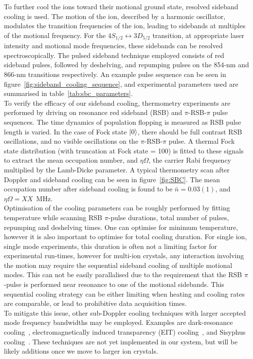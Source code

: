     To further cool the ions toward their motional ground state, resolved
    sideband cooling is used. The motion of the ion, described by a harmonic oscillator,
    modulates the transition frequencies of the ion, leading to sidebands at
    multiples of the motional frequency. For the $4S_{1/2} \leftrightarrow
    3D_{5/2}$ transition, at appropriate laser intensity and motional mode
    frequencies, these sidebands can be resolved spectroscopically. The pulsed
    sideband technique employed consists of red sideband pulses, followed by
    deshelving, and repumping pulses on the 854-nm and 866-nm transitions
    respectively. An example pulse sequence can be seen in
    figure~\ref{fig:sideband_cooling_sequence}, and experimental parameters used are summarised in table~\ref{tab:sbc_parameters}. \\
    To verify the efficacy of our sideband cooling, thermometry
    experiments are performed by driving on resonance red sideband (RSB) and $\pi$-RSB-$\pi$ pulse
    sequences. The time dynamics of population flopping is measured as RSB
    pulse length is varied. In the case of Fock state $\ket{0}$, there should be full contrast 
    RSB oscillations, and no visible oscillations on the $\pi$-RSB-$\pi$ pulse. A thermal
    Fock state distribution (with truncation at Fock state = 100) is fitted to these
    signals to extract the mean occupation number, and $\eta\Omega$, the carrier
    Rabi frequency multiplied by the Lamb-Dicke parameter. A typical thermometry
    scan after Doppler and sideband cooling can be seen in
    figure~\ref{fig:SBC}. The mean occupation
    number after sideband cooling is found to be $\bar{n} = 0.03(1)$, and $\eta\Omega =
    XX$~\unit{\MHz}.\\
    Optimisation of the cooling parameters can be roughly performed by fitting
    temperature while scanning RSB $\pi$-pulse durations, total number of pulses,
    repumping and deshelving times. One can optimise for minimum temperature,
    however it is also important to optimise for total cooling duration. For
    single ion, single mode experiments, this duration is often not a limiting factor for experimental run-times,
    however for multi-ion crystals, any interaction involving the motion may
    require the sequential sideband cooling of multiple motional modes. This can
    not be easily parallalised due to the requirement that the RSB $\pi$-pulse is
    performed near resonance to one of the motional sidebands. This sequential
    cooling strategy can be either limiting when heating and cooling rates are
    comparable, or lead to prohibitive data acquisition times.\\
    To mitigate this issue, other sub-Doppler cooling techniques with larger
    accepted mode frequency bandwidths may be employed. Examples are dark-resonance
    cooling~\cite{reis1996cooling,allcock2016dark-resonance}, electromagnetically induced transparency (EIT) cooling~\cite{roos2000experimental}, and
    Sisyphus cooling~\cite{cirac1992laser}. These techniques are not yet implemented in our system,
    but will be likely additions once we move to larger ion crystals.\\

